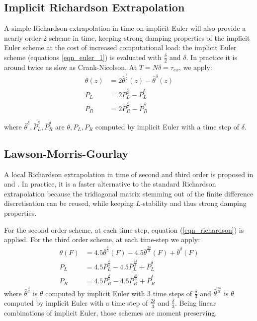 \documentclass[]{rAMF2e}
\begin{document}
\subsection{Implicit Richardson Extrapolation}
A simple Richardson extrapolation in time \citep{richardson1911approximate} on implicit Euler will also provide a nearly order-2 scheme in time, keeping strong damping properties of the implicit Euler scheme at the cost of increased computational load: the implicit Euler scheme (equations \ref{eqn_euler_1}) is evaluated with $\frac{\delta}{2}$ and $\delta$. In practice it is around twice as slow as Crank-Nicolson. At $T=N\delta=\tau_{ex}$, we apply:
\begin{align}\label{eqn_richardson}
\theta(z) &= 2 \bar{\theta}^{\frac{\delta}{2}}(z) - \bar{\theta}^{\delta}(z) \\
P_L &= 2 \bar{P}^{\frac{\delta}{2}}_L - \bar{P}^{\delta}_L\\
P_R &= 2 \bar{P}^{\frac{\delta}{2}}_R - \bar{P}^{\delta}_R
\end{align}

where $\bar{\theta}^{\delta}, \bar{P}_L^{\delta}, \bar{P}_R^{\delta}$ are $\theta, P_L, P_R$ computed by implicit Euler with a time step of $\delta$.


\subsection{Lawson-Morris-Gourlay}
A local Richardson extrapolation in time of second and third order is proposed in \citep{lawson1978extrapolation} and \citep{gourlay1980extrapolation}. In practice, it is a faster alternative to the standard Richardson extrapolation because the tridiagonal matrix stemming out of the finite difference discretisation can be reused, while keeping $L$-stability and thus strong damping properties.

For the second order scheme, at each time-step, equation (\ref{eqn_richardson}) is applied.
For the third order scheme, at each time-step we apply:
\begin{align}\label{eqn_lmg3}
\theta(F) &= 4.5 \bar{\theta}^{\frac{\delta}{3}}(F) - 4.5 \bar{\theta}^{\frac{2\delta}{3}}(F)  + \bar{\theta}^{\delta}(F)\\
P_L &= 4.5 \bar{P}^{\frac{\delta}{3}}_L - 4.5 \bar{P}^{\frac{2\delta}{3}}_L  + \bar{P}^{\delta}_L\\
P_R &= 4.5 \bar{P}^{\frac{\delta}{3}}_R - 4.5 \bar{P}^{\frac{2\delta}{3}}_R  + \bar{P}^{\delta}_R
\end{align}
where $\bar{\theta}^{\frac{\delta}{3}}$ is $\theta$ computed by implicit Euler with 3 time steps of $\frac{\delta}{3}$ and $\bar{\theta}^{\frac{2\delta}{3}}$ is $\theta$ computed by implicit Euler with a time step of $\frac{2\delta}{3}$ and $\frac{\delta}{3}$. Being linear combinations of implicit Euler, those schemes are moment preserving.
\end{document}
